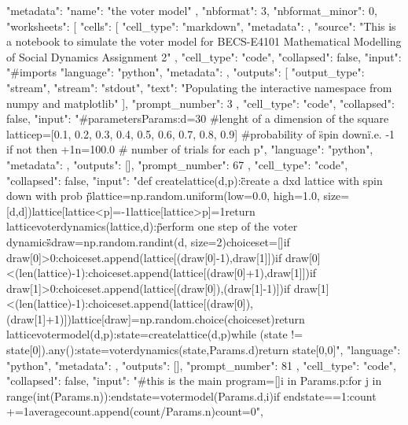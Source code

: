 {
 "metadata": {
  "name": "the voter model"
 },
 "nbformat": 3,
 "nbformat_minor": 0,
 "worksheets": [
  {
   "cells": [
    {
     "cell_type": "markdown",
     "metadata": {},
     "source": "This is a notebook to simulate the voter model for BECS-E4101 Mathematical Modelling of Social Dynamics Assignment 2"
    },
    {
     "cell_type": "code",
     "collapsed": false,
     "input": "#imports\n%
     "language": "python",
     "metadata": {},
     "outputs": [
      {
       "output_type": "stream",
       "stream": "stdout",
       "text": "Populating the interactive namespace from numpy and matplotlib\n"
      }
     ],
     "prompt_number": 3
    },
    {
     "cell_type": "code",
     "collapsed": false,
     "input": "#parameters\nclass Params:\n    d=30 #lenght of a dimension of the square lattice\n    p=[0.1, 0.2, 0.3, 0.4, 0.5, 0.6, 0.7, 0.8, 0.9] #probability of \"spin down\" i.e. -1 if not then +1\n    n=100.0 # number of trials for each p",
     "language": "python",
     "metadata": {},
     "outputs": [],
     "prompt_number": 67
    },
    {
     "cell_type": "code",
     "collapsed": false,
     "input": "def createlattice(d,p):\n    \"\"\"create a dxd lattice with spin down with prob p\"\"\" \n    lattice=np.random.uniform(low=0.0, high=1.0, size=[d,d])\n    lattice[lattice<p]=-1\n    lattice[lattice>p]=1\n    return lattice\n\ndef voterdynamics(lattice,d):\n    \"\"\"perform one step of the voter dynamics\"\"\" \n    draw=np.random.randint(d, size=2)\n    choiceset=[]\n    if draw[0]>0:\n        choiceset.append(lattice[(draw[0]-1),draw[1]])\n    if draw[0]<(len(lattice)-1):\n        choiceset.append(lattice[(draw[0]+1),draw[1]])\n    if draw[1]>0:\n        choiceset.append(lattice[(draw[0]),(draw[1]-1)])\n    if draw[1]<(len(lattice)-1):\n        choiceset.append(lattice[(draw[0]),(draw[1]+1)])\n    lattice[draw]=np.random.choice(choiceset)\n    return lattice\n\ndef votermodel(d,p):\n    state=createlattice(d,p)\n    while (state != state[0]).any():\n        state=voterdynamics(state,Params.d)\n    return state[0,0]",
     "language": "python",
     "metadata": {},
     "outputs": [],
     "prompt_number": 81
    },
    {
     "cell_type": "code",
     "collapsed": false,
     "input": "#this is the main program\naveragecount=[]\nfor i in Params.p:\n    for j in range(int(Params.n)):\n        endstate=votermodel(Params.d,i)\n        if endstate==1:\n            count +=1\n    averagecount.append(count/Params.n)\n    count=0",
}}}
